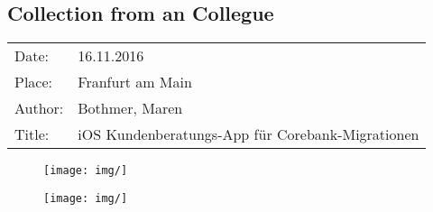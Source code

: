 \subsection*{Collection from an Collegue}
\begin{tabular}{l l}
Date: & 16.11.2016 \\
Place: & Franfurt am Main \\
Author: & Bothmer, Maren \\
Title: & iOS Kundenberatungs-App für Corebank-Migrationen
\end{tabular}

    
\begin{figure}[H] 
    \begin{minipage}[b]{.5\linewidth}
        \centering\texttt{[image: img/]}
        \subcaption{}
    \end{minipage}%
    \begin{minipage}[b]{.5\linewidth}
        \centering\texttt{[image: img/]}
    \end{minipage}
    \caption{}
\end{figure}
